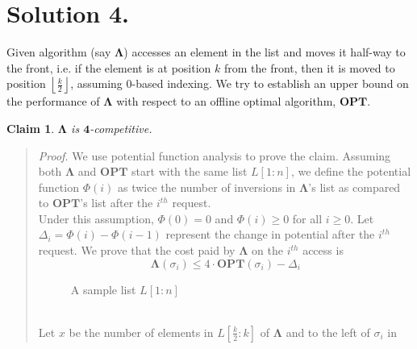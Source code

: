 \documentclass[11pt]{article}
\newtheorem{claim}{Claim}
\begin{document}
\section*{Solution 4.}
Given algorithm (say $\mathbf{\Lambda}$) accesses an element in the list and moves it half-way to the front, i.e.
if the element is at position $k$ from the front, then it is moved to position $\left \lfloor \frac{k}{2} \right \rfloor$,
assuming 0-based indexing. We try to establish an upper bound on the performance of $\mathbf{\Lambda}$ with respect to an offline
optimal algorithm, $\mathbf{OPT}$.
\begin{claim}
    \label{alg_k_by_2}
    $\mathbf{\Lambda}$ is $\mathbf{4}$-competitive.
\end{claim}
\begin{quote}
    \textit{Proof.} We use potential function analysis to prove the claim. Assuming both $\mathbf{\Lambda}$ and $\mathbf{OPT}$ start
    with the same list $L[1:n]$, we define the potential function $\Phi(i)$ as twice the number of inversions in $\mathbf{\Lambda}$'s
    list as compared to $\mathbf{OPT}$'s list after the $i^{th}$ request. \\
    Under this assumption, $\Phi(0) = 0$ and $\Phi(i) \geq 0$ for all $i \geq 0$. Let $\Delta_{i} = \Phi(i) - \Phi(i-1)$ represent the
    change in potential after the $i^{th}$ request. We prove that the cost paid by $\mathbf{\Lambda}$ on the $i^{th}$ access is
    \begin{equation}
        \label{cost}
        \mathbf{\Lambda}(\sigma_{i}) \leq 4 \cdot \mathbf{OPT}(\sigma_{i}) - \Delta_{i}
    \end{equation}
    \begin{figure}
        \centering
        \caption{A sample list $L[1:n]$}
        \label{fig:list-of-boxes}
    \end{figure}
    \vspace*{0pt} \\[0.01pt]
    Let $x$ be the number of elements in $L\left[ \frac{k}{2}:k \right]$ of $\mathbf{\Lambda}$ and to the left of $\sigma_{i}$ in

\end{quote}
\end{document}
